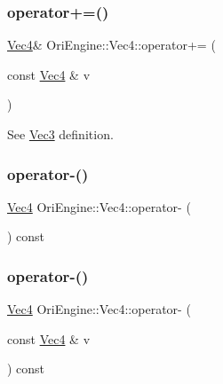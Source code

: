 \subsubsection{\texorpdfstring{operator+=()}{operator+=()}}
{\footnotesize\ttfamily \hyperlink{struct_ori_engine_1_1_vec4}{Vec4}\& Ori\+Engine\+::\+Vec4\+::operator+= (\begin{DoxyParamCaption}\item[{const \hyperlink{struct_ori_engine_1_1_vec4}{Vec4} \&}]{v }\end{DoxyParamCaption})\hspace{0.3cm}{\ttfamily [inline]}}



See \hyperlink{struct_ori_engine_1_1_vec3}{Vec3} definition. 

\hypertarget{struct_ori_engine_1_1_vec4_aa84e93dcbac56ffa66068af8abd1aed5}{}\label{struct_ori_engine_1_1_vec4_aa84e93dcbac56ffa66068af8abd1aed5} 
\subsubsection{\texorpdfstring{operator-\/()}{operator-()}\hspace{0.1cm}{\footnotesize\ttfamily [1/2]}}
{\footnotesize\ttfamily \hyperlink{struct_ori_engine_1_1_vec4}{Vec4} Ori\+Engine\+::\+Vec4\+::operator-\/ (\begin{DoxyParamCaption}{ }\end{DoxyParamCaption}) const\hspace{0.3cm}{\ttfamily [inline]}}

\hypertarget{struct_ori_engine_1_1_vec4_ab9f5420252322ccd1a683a78eb7177cb}{}\label{struct_ori_engine_1_1_vec4_ab9f5420252322ccd1a683a78eb7177cb} 
\subsubsection{\texorpdfstring{operator-\/()}{operator-()}\hspace{0.1cm}{\footnotesize\ttfamily [2/2]}}
{\footnotesize\ttfamily \hyperlink{struct_ori_engine_1_1_vec4}{Vec4} Ori\+Engine\+::\+Vec4\+::operator-\/ (\begin{DoxyParamCaption}\item[{const \hyperlink{struct_ori_engine_1_1_vec4}{Vec4} \&}]{v }\end{DoxyParamCaption}) const\hspace{0.3cm}{\ttfamily [inline]}}



